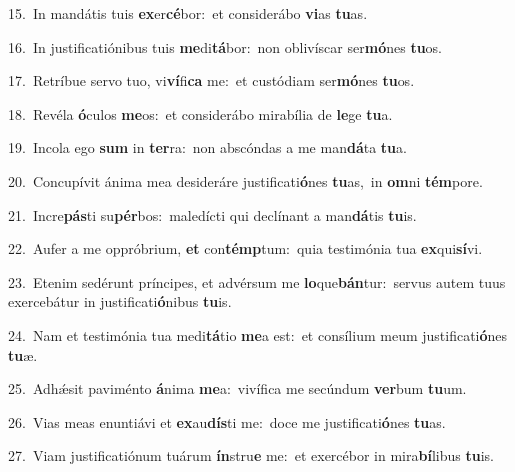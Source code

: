 {\numbfont\textcolor{\numbcolor}{15.}}~In mandátis tuis \textbf{ex}\-er\-\textbf{cé}\-bor:~\star et considerábo \textbf{vi}\-as \textbf{tu}\-as.\par
{\numbfont\textcolor{\numbcolor}{16.}}~In justificatiónibus tuis \textbf{me}\-di\-\textbf{tá}\-bor:~\star non oblivíscar ser\-\textbf{mó}\-nes \textbf{tu}\-os.\par
{\numbfont\textcolor{\numbcolor}{17.}}~Retríbue servo tuo, vi\-\textbf{ví}\-fi\textbf{ca} me:~\star et custódiam ser\-\textbf{mó}\-nes \textbf{tu}\-os.\par
{\numbfont\textcolor{\numbcolor}{18.}}~Revéla \textbf{ó}\-culos \textbf{me}\-os:~\star et considerábo mirabília de \textbf{le}\-ge \textbf{tu}\-a.\par
{\numbfont\textcolor{\numbcolor}{19.}}~Incola ego \textbf{sum} in \textbf{ter}\-ra:~\star non abscóndas a me man\-\textbf{dá}\-ta \textbf{tu}\-a.\par
{\numbfont\textcolor{\numbcolor}{20.}}~Concupívit ánima mea desideráre justificati\-\textbf{ó}\-nes \textbf{tu}\-as,~\star in \textbf{om}\-ni \textbf{tém}\-pore.\par
{\numbfont\textcolor{\numbcolor}{21.}}~Incre\-\textbf{pás}\-ti su\-\textbf{pér}\-bos:~\star maledícti qui declínant a man\-\textbf{dá}\-tis \textbf{tu}\-is.\par
{\numbfont\textcolor{\numbcolor}{22.}}~Aufer a me oppróbrium, \textbf{et} con\-\textbf{témp}\-tum:~\star quia testimónia tua \textbf{ex}\-qui\-\textbf{sí}\-vi.\par
{\numbfont\textcolor{\numbcolor}{23.}}~Etenim sedérunt príncipes, et advérsum me \textbf{lo}\-que\-\textbf{bán}\-tur:~\star servus autem tuus exercebátur in justificati\-\textbf{ó}\-nibus \textbf{tu}\-is.\par
{\numbfont\textcolor{\numbcolor}{24.}}~Nam et testimónia tua medi\-\textbf{tá}\-tio \textbf{me}\-a est:~\star et consílium meum justificati\-\textbf{ó}\-nes \textbf{tu}\-æ.\par
{\numbfont\textcolor{\numbcolor}{25.}}~Adhǽsit paviménto \textbf{á}\-nima \textbf{me}\-a:~\star vivífica me secúndum \textbf{ver}\-bum \textbf{tu}\-um.\par
{\numbfont\textcolor{\numbcolor}{26.}}~Vias meas enuntiávi et \textbf{ex}\-au\-\textbf{dís}\-ti me:~\star doce me justificati\-\textbf{ó}\-nes \textbf{tu}\-as.\par
{\numbfont\textcolor{\numbcolor}{27.}}~Viam justificatiónum tuárum \textbf{ín}\-stru\textbf{e} me:~\star et exercébor in mira\-\textbf{bí}\-libus \textbf{tu}\-is.\par
